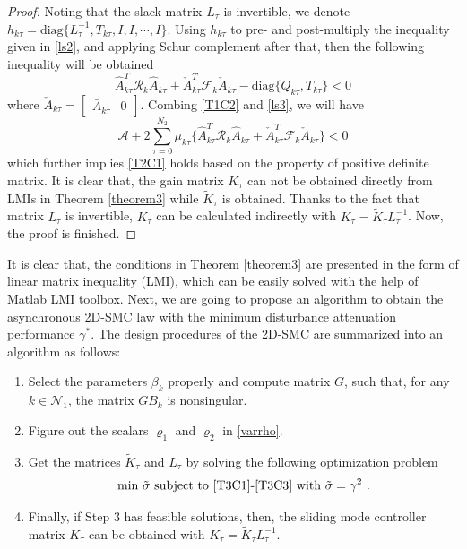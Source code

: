 \documentclass[conference]{IEEEtran}
\begin{document}
\begin{proof}
	 Noting that the slack matrix $L_{\tau }$ is invertible, we denote $h_{k\tau }= \mathrm{diag}\{L^{-1}_{\tau }, T_{k\tau }, I, I,\cdots, I \}$. Using $h_{k\tau }$ to  pre- and post-multiply the inequality given in \eqref{ls2}, and applying Schur complement after that, then the following inequality will be obtained
	 \begin{equation} \label{ls3}
	 	\hat{A}^{T}_{k\tau }\mathcal{R}_{k}\hat{A}_{k\tau } + \check{A}^{T}_{k\tau }\mathcal{F}_{k}\check{A}_{k\tau }  - \mathrm{diag}\{Q_{k\tau }, T_{k\tau }\} < 0  
	 \end{equation}
	 where $\check{A}_{k\tau }=\begin{bmatrix}
	 \bar{A}_{k\tau }&0
	 \end{bmatrix}$. Combing \eqref{T1C2} and \eqref{ls3},  we will have
	 \begin{equation}
	 	\mathcal{A} +2\sum_{\tau =0}^{N_{2}}\mu_{k\tau }\Big\{ \hat{A}^{T}_{k\tau }\mathcal{R}_{k}\hat{A}_{k\tau } + \check{A}^{T}_{k\tau }\mathcal{F}_{k}\check{A}_{k\tau } \Big\} < 0
	 \end{equation}
	 which further implies \eqref{T2C1} holds based on the property of positive definite matrix. It is clear that, the gain matrix $K_{\tau }$ can not be obtained directly from LMIs in Theorem \ref{theorem3} while $\tilde{K}_{\tau }$ is obtained. Thanks  to the fact that matrix $L_{\tau }$ is invertible, $K_{\tau }$ can be calculated indirectly with $K_{\tau }=\tilde{K}_{\tau }L^{-1}_{\tau }$. Now, the proof is finished.
\end{proof}


	It is clear that, the conditions in Theorem \ref{theorem3} are presented in the form of linear matrix inequality (LMI), which can be easily solved with the help of Matlab LMI toolbox. Next, we are going to propose an algorithm to obtain the asynchronous 2D-SMC law with the minimum disturbance attenuation performance $\gamma^{*}$. The design procedures of the 2D-SMC are summarized into an algorithm as follows:
	\begin{enumerate}
		\item Select the parameters $\beta_{k}$ properly and compute matrix $G$, such that, for any $k\in\mathcal{N}_{1}$,  the  matrix $GB_{k}$ is nonsingular.
		\item Figure out the scalars $\varrho_{1}$ and $\varrho_{2}$ in \eqref{varrho}.
		\item Get the matrices  $\tilde{K}_{\tau }$ and $L_{\tau }$ by solving the  following optimization problem
		\begin{equation}\label{optimization-problem}
		\text{min $\tilde{\sigma}$ subject to \eqref{T3C1}-\eqref{T3C3} with $\tilde\sigma=\gamma^{2}$ }.
		\end{equation}
		\item Finally, if Step 3 has feasible solutions, then, the sliding mode controller matrix $K_{\tau }$ can be obtained with $K_{\tau }= \tilde{K}_{\tau }L^{-1}_{\tau }$.
	\end{enumerate}
\end{document}
